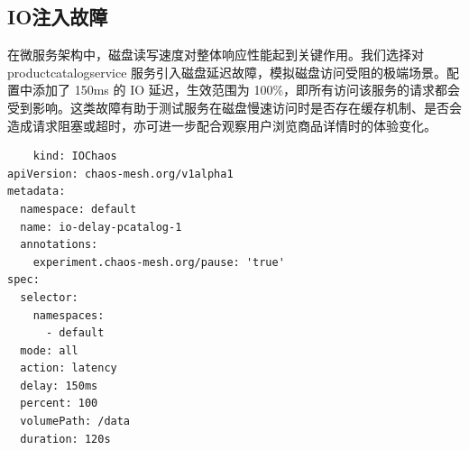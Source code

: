 \documentclass[hyperref,a4paper,UTF8]{ctexart}
\begin{document}
\subsection{IO注入故障}
在微服务架构中，磁盘读写速度对整体响应性能起到关键作用。我们选择对 productcatalogservice 服务引入磁盘延迟故障，模拟磁盘访问受阻的极端场景。配置中添加了 150ms 的 IO 延迟，生效范围为 100\%，即所有访问该服务的请求都会受到影响。这类故障有助于测试服务在磁盘慢速访问时是否存在缓存机制、是否会造成请求阻塞或超时，亦可进一步配合观察用户浏览商品详情时的体验变化。

\begin{lstlisting}
    kind: IOChaos
apiVersion: chaos-mesh.org/v1alpha1
metadata:
  namespace: default
  name: io-delay-pcatalog-1
  annotations:
    experiment.chaos-mesh.org/pause: 'true'
spec:
  selector:
    namespaces:
      - default
  mode: all
  action: latency
  delay: 150ms
  percent: 100
  volumePath: /data
  duration: 120s
\end{lstlisting}
\end{document}

